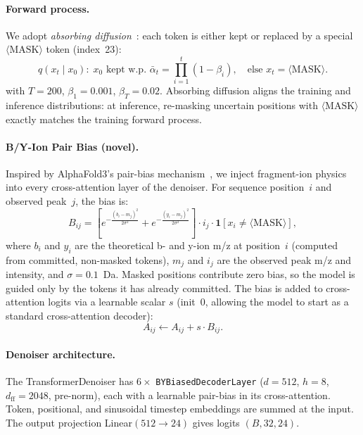 \documentclass[11pt]{article}
\begin{document}
\paragraph{Forward process.}
We adopt \emph{absorbing diffusion}~\cite{d3pm}: each token is either kept or
replaced by a special $\langle\text{MASK}\rangle$ token (index~23):
\begin{equation}
  q(x_t \mid x_0):\; x_0 \text{ kept w.p. } \bar\alpha_t =
  \prod_{i=1}^{t}(1-\beta_i),\quad \text{else } x_t = \langle\text{MASK}\rangle.
\end{equation}
with $T=200$, $\beta_1=0.001$, $\beta_T=0.02$. Absorbing diffusion aligns the
training and inference distributions: at inference, re-masking uncertain positions
with $\langle\text{MASK}\rangle$ exactly matches the training forward process.

\paragraph{B/Y-Ion Pair Bias (novel).}
Inspired by AlphaFold3's pair-bias mechanism~\cite{instanovo}, we inject
fragment-ion physics into every cross-attention layer of the denoiser. For
sequence position~$i$ and observed peak~$j$, the bias is:
\begin{equation}
  B_{ij} = \left[
    e^{-\frac{(b_i - m_j)^2}{2\sigma^2}} +
    e^{-\frac{(y_i - m_j)^2}{2\sigma^2}}
  \right] \cdot i_j \cdot \mathbf{1}[x_i \neq \langle\text{MASK}\rangle],
\end{equation}
where $b_i$ and $y_i$ are the theoretical b- and y-ion m/z at position~$i$
(computed from committed, non-masked tokens), $m_j$ and $i_j$ are the observed
peak m/z and intensity, and $\sigma=0.1$~Da. Masked positions contribute zero
bias, so the model is guided only by the tokens it has already committed.
The bias is added to cross-attention logits via a learnable scalar $s$ (init~$0$,
allowing the model to start as a standard cross-attention decoder):
\begin{equation}
  A_{ij} \leftarrow A_{ij} + s \cdot B_{ij}.
\end{equation}

\paragraph{Denoiser architecture.}
The TransformerDenoiser has $6\times$ \texttt{BYBiasedDecoderLayer}
($d=512$, $h=8$, $d_\text{ff}=2048$, pre-norm), each with a learnable pair-bias
in its cross-attention. Token, positional, and sinusoidal timestep embeddings are
summed at the input. The output projection Linear$(512\!\to\!24)$ gives logits
$(B, 32, 24)$.
\end{document}

